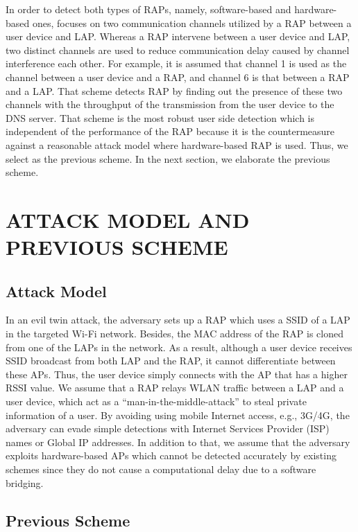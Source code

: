 \documentclass[conference]{IEEEtran}
\begin{document}
In order to detect both types of RAPs, namely, software-based and hardware-based ones, \cite{previous} focuses on two communication channels utilized by a RAP between a user device and LAP.
Whereas a RAP intervene between a user device and LAP, two distinct channels are used to reduce communication delay caused by channel interference each other.
For example, it is assumed that channel 1 is used as the channel between a user device and a RAP, and channel 6 is that between a RAP and a LAP.
That scheme detects RAP by finding out the presence of these two channels with the throughput of the transmission from the user device to the DNS server.
That scheme is the most robust user side detection which is independent of the performance of the RAP because it is the countermeasure against a reasonable attack model where hardware-based RAP is used.
Thus, we select \cite{previous} as the previous scheme.
In the next section, we elaborate the previous scheme.

\section{ATTACK MODEL AND PREVIOUS SCHEME}\label{sec:3}
\subsection{Attack Model}
In an evil twin attack, the adversary sets up a RAP which uses a SSID of a LAP in the targeted Wi-Fi network.
Besides, the MAC address of the RAP is cloned from one of the LAPs in the network.
As a result, although a user device receives SSID broadcast from both LAP and the RAP, it cannot differentiate between these APs.
Thus, the user device simply connects with the AP that has a higher RSSI value.
We assume that a RAP relays WLAN traffic between a LAP and a user device, which act as a ``man-in-the-middle-attack'' to steal private information of a user.
By avoiding using mobile Internet access, e.g., 3G/4G, the adversary can evade simple detections with Internet Services Provider (ISP) names or Global IP addresses\cite{rtt}.
In addition to that, we assume that the adversary exploits hardware-based APs which cannot be detected accurately by existing schemes since they do not cause a computational delay due to a software bridging.

\subsection{Previous Scheme}
\end{document}

